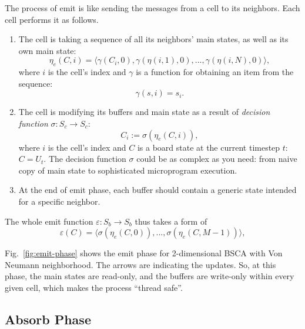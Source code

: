 \documentclass[a4paper,12pt,tikz,UTF8]{article}
\begin{document}
    The process of emit is like sending the messages from a cell to its neighbors. Each cell performs it as follows.
    \begin{enumerate}
      \item 
        The cell is taking a sequence of all its neighbors' main states, as well as its own main state:
        \begin{equation}
          \label{eq:neighbors-main-sequence}
          \eta_e(C, i) = \langle \gamma({C_i}, 0), \gamma(\eta(i, 1), 0), ..., \gamma(\eta(i, N), 0) \rangle,
        \end{equation}
        where $i$ is the cell's index and $\gamma$ is a function for obtaining an item from the sequence:
        \begin{equation}
          \label{eq:item-obtaining}
          \gamma(s, i) = s_i.
        \end{equation}
      \item
        The cell is modifying its buffers and main state as a result of \textit{decision function} $\sigma: S_c \to S_c$:
        \begin{equation}
          C_i := \sigma(\eta_e(C, i)),
        \end{equation}
        where $i$ is the cell's index and $C$ is a board state at the current timestep $t$: $C = U_t$. The decision function $\sigma$ could be as complex as you need: from naive copy of main state to sophisticated microprogram execution.
      \item
        At the end of emit phase, each buffer should contain a generic state intended for a specific neighbor.
    \end{enumerate}

    The whole emit function $\varepsilon: S_b \to S_b$ thus takes a form of
    \begin{equation}
      \varepsilon(C) = \langle \sigma(\eta_e(C, 0)), ..., \sigma(\eta_e(C, M - 1)) \rangle,
    \end{equation}

    Fig.~\ref{fig:emit-phase} shows the emit phase for 2-dimensional BSCA with Von Neumann neighborhood. The arrows are indicating the updates. So, at this phase, the main states are read-only, and the buffers are write-only within every given cell, which makes the process ``thread safe''.

  \subsection{Absorb Phase}
\end{document}
